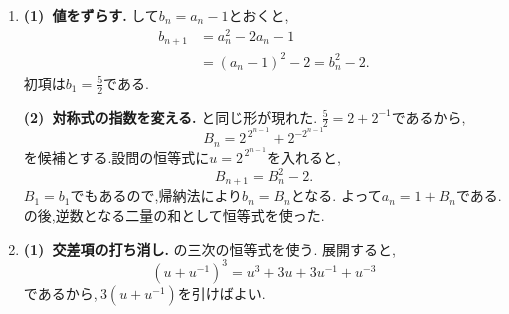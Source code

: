 \begin{enumerate}[label=\textbf{問\arabic*.},leftmargin=3.8em,format=\bookitemlink{practice-special}{solution}{problem}]
                \smallskip
                \textbf{(2)~部分列からへ.}
                奇数番目と偶数番目のどちらも$\displaystyle 0$へ近づく.
                全体としても,\,$\displaystyle n\ge2$ではから
                \[
                  0<a_n\le\frac2{n-1}
                \]
                となるので,\,$\displaystyle a_n\to0$である.
                添字を分けたあとには,各部分列の答えを元の添字へ戻して確認する.
          \item \textbf{(1)~値をずらす.}
                して$\displaystyle b_n=a_n-1$とおくと,
                \begin{align*}
                  b_{n+1}&=a_n^2-2a_n-1\\
                         &=(a_n-1)^2-2=b_n^2-2.
                \end{align*}
                初項は$\displaystyle b_1=\frac52$である.

                \smallskip
                \textbf{(2)~対称式の指数を変える.}
                と同じ形が現れた.
                $\displaystyle \frac52=2+2^{-1}$であるから,
                \[
                  B_n=2^{\,2^{n-1}}+2^{-2^{n-1}}
                \]
                を候補とする.設問の恒等式に$\displaystyle u=2^{\,2^{n-1}}$を入れると,
                \[
                  B_{n+1}=B_n^2-2.
                \]
                $\displaystyle B_1=b_1$でもあるので,帰納法により$\displaystyle b_n=B_n$となる.
                よって$\displaystyle a_n=1+B_n$である.
                の後,逆数となる二量の和として恒等式を使った.
          \item \textbf{(1)~交差項の打ち消し.}
                の三次の恒等式を使う.
                展開すると,
                \[
                  (u+u^{-1})^3=u^3+3u+3u^{-1}+u^{-3}
                \]
                であるから,\,$\displaystyle 3(u+u^{-1})$を引けばよい.


\end{enumerate}
